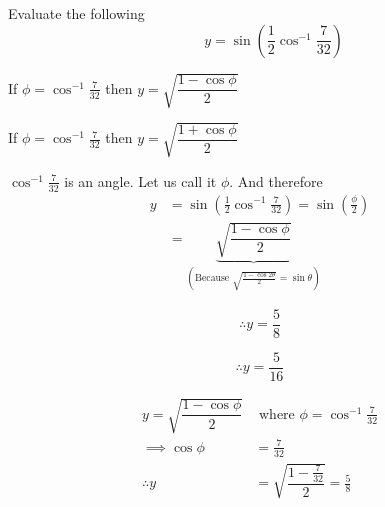 \documentclass[14pt,fleqn]{extarticle}
\newcommand\val{\frac{7}{32}}
\newcommand\angb{\cos^{-1}\val}
\begin{document}
 
\begin{question}
	\statement 
    
    Evaluate the following 
    \[\qquad y = \sin \left(\frac{1}{2}\cos^{-1}\val \right)\]
    
    \begin{step}
  \begin{options} 
     \correct 
       
       If $\phi = \cos^{-1} \val$ then $y = \sqrt{\dfrac{1-\cos\phi}{2}}$
     
     \incorrect
     
     If $\phi = \cos^{-1} \val$ then $y = \sqrt{\dfrac{1+\cos\phi}{2}}$
    \end{options} 
     \reason 
     
     $\cos^{-1}\val$ is an angle. Let us call it $\phi$. And therefore
    \begin{align}
	y &= \sin \left(\frac{1}{2}\angb \right) = \sin \left(\frac{\phi}{2} \right) \\
	&= \underbrace{\sqrt{\dfrac{1-\cos\phi}{2}}}_{\left(\text{Because } \sqrt{\frac{1-\cos 2\theta}{2}} = \sin\theta \right)}
\end{align}
       
\end{step}

\begin{step}
  \begin{options} 
     \correct 
       
       \[\therefore y = \frac{5}{8} \]
        
    \incorrect 
    
    \[\therefore y = \frac{5}{16} \]
    \end{options} 
     \reason 
     
     \begin{align}
     y = \sqrt{\dfrac{1-\cos \phi}{2}}&\text{ where } \phi=\angb \\
     \implies \cos\phi &= \val \\
     \therefore y &= \sqrt{\dfrac{1-\val}{2}} = \frac{5}{8}
\end{align}
       
\end{step}
\end{question} 
\end{document}
